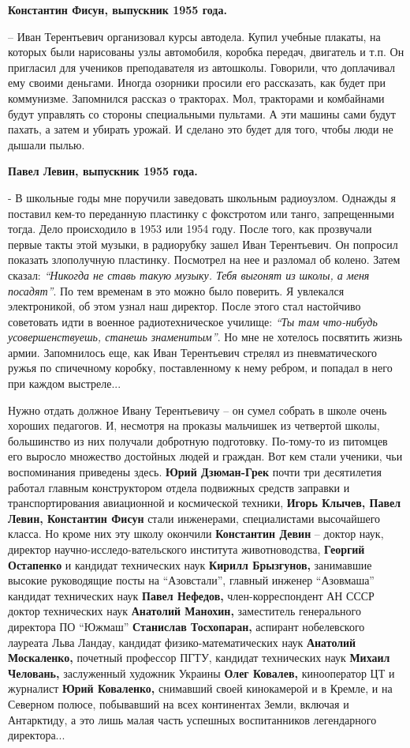 \textbf{Константин Фисун, выпускник 1955 года.}

– Иван Терентьевич организовал курсы автодела. Купил учебные плакаты, на
которых были нарисованы узлы автомобиля, коробка передач, двигатель и т.п. Он
пригласил для учеников преподавателя из автошколы. Говорили, что доплачивал ему
своими деньгами. Иногда озорники просили его рассказать, как будет при
коммунизме. Запомнился рассказ о тракторах. Мол, тракторами и комбайнами будут
управлять со стороны специальными пультами. А эти машины сами будут пахать, а
затем и убирать урожай. И сделано это будет для того, чтобы люди не дышали
пылью.

\textbf{Павел Левин, выпускник 1955 года.}

- В школьные годы мне поручили заведовать школьным радиоузлом. Однажды я
поставил кем-то переданную пластинку с фокстротом или танго, запрещенными
тогда. Дело происходило в 1953 или 1954 году. После того, как прозвучали первые
такты этой музыки, в радиорубку зашел Иван Терентьевич. Он попросил показать
злополучную пластинку. Посмотрел на нее и разломал об колено. Затем сказал:
\emph{\enquote{Никогда не ставь такую музыку. Тебя выгонят из школы, а меня посадят}}. По тем
временам в это можно было поверить. Я увлекался электроникой, об этом узнал наш
директор. После этого стал настойчиво советовать идти в военное
радиотехническое училище: \emph{\enquote{Ты там что-нибудь усовершенствуешь, станешь
знаменитым}}. Но мне не хотелось посвятить жизнь армии. Запомнилось еще, как
Иван Терентьевич стрелял из пневматического ружья по спичечному коробку,
поставленному к нему ребром, и попадал в него при каждом выстреле...

Нужно отдать должное Ивану Терентьевичу – он сумел собрать в школе очень
хороших педагогов. И, несмотря на проказы мальчишек из четвертой школы,
большинство из них получали добротную подготовку. По\hyp{}тому-то из питомцев его
выросло множество достойных людей и граждан. Вот кем стали ученики, чьи
воспоминания приведены здесь. \textbf{Юрий Дзюман-Грек} почти три десятилетия работал
главным конструктором отдела подвижных средств заправки и транспортирования
авиационной и космической техники, \textbf{Игорь Клычев, Павел Левин, Константин Фисун}
стали инженерами, специалистами высочайшего класса. Но кроме них эту школу
окончили \textbf{Константин Девин} – доктор наук, директор научно-исследо\hyp{}вательского
института животноводства, \textbf{Георгий Остапенко} и кандидат технических наук \textbf{Кирилл
Брызгунов,} занимавшие высокие руководящие посты на \enquote{Азовстали}, главный инженер
\enquote{Азовмаша} кандидат технических наук \textbf{Павел Нефедов,} член-корреспондент АН СССР
доктор технических наук \textbf{Анатолий Манохин,} заместитель генерального директора ПО
\enquote{Южмаш} \textbf{Станислав Тосхопаран,} аспирант нобелевского лауреата Льва Ландау,
кандидат физико-математических наук \textbf{Анатолий Москаленко,} почетный профессор
ПГТУ, кандидат технических наук \textbf{Михаил Человань,} заслуженный художник Украины
\textbf{Олег Ковалев,} кинооператор ЦТ и журналист \textbf{Юрий Коваленко,} снимавший своей
кинокамерой и в Кремле, и на Северном полюсе, побывавший на всех континентах
Земли, включая и Антарктиду, а это лишь малая часть успешных воспитанников
легендарного директора...

